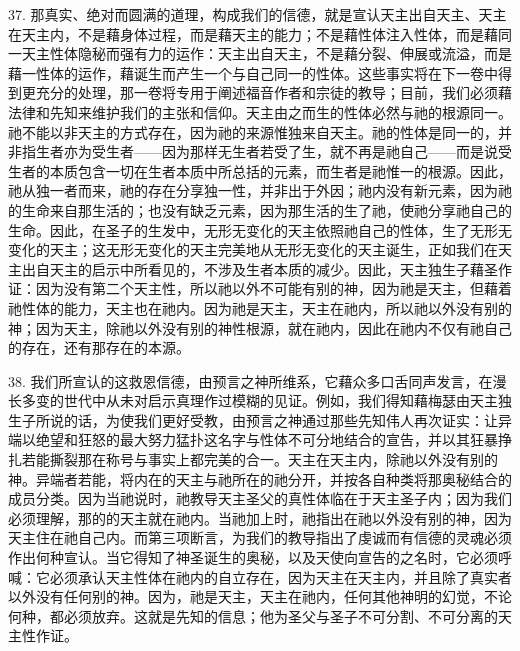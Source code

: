 37. 那真实、绝对而圆满的道理，构成我们的信德，就是宣认天主出自天主、天主在天主内，不是藉身体过程，而是藉天主的能力；不是藉性体注入性体，而是藉同一天主性体隐秘而强有力的运作：天主出自天主，不是藉分裂、伸展或流溢，而是藉一性体的运作，藉诞生而产生一个与自己同一的性体。这些事实将在下一卷中得到更充分的处理，那一卷将专用于阐述福音作者和宗徒的教导；目前，我们必须藉法律和先知来维护我们的主张和信仰。天主由之而生的性体必然与祂的根源同一。祂不能以非天主的方式存在，因为祂的来源惟独来自天主。祂的性体是同一的，并非指生者亦为受生者——因为那样无生者若受了生，就不再是祂自己——而是说受生者的本质包含一切在生者本质中所总括的元素，而生者是祂惟一的根源。因此，祂从独一者而来，祂的存在分享独一性，并非出于外因；祂内没有新元素，因为祂的生命来自那生活的；也没有缺乏元素，因为那生活的生了祂，使祂分享祂自己的生命。因此，在圣子的生发中，无形无变化的天主依照祂自己的性体，生了无形无变化的天主；这无形无变化的天主完美地从无形无变化的天主诞生，正如我们在天主出自天主的启示中所看见的，不涉及生者本质的减少。因此，天主独生子藉圣作证：因为没有第二个天主性，所以祂以外不可能有别的神，因为祂是天主，但藉着祂性体的能力，天主也在祂内。因为祂是天主，天主在祂内，所以祂以外没有别的神；因为天主，除祂以外没有别的神性根源，就在祂内，因此在祂内不仅有祂自己的存在，还有那存在的本源。\par

38. 我们所宣认的这救恩信德，由预言之神所维系，它藉众多口舌同声发言，在漫长多变的世代中从未对启示真理作过模糊的见证。例如，我们得知藉梅瑟由天主独生子所说的话，为使我们更好受教，由预言之神通过那些先知伟人再次证实：让异端以绝望和狂怒的最大努力猛扑这名字与性体不可分地结合的宣告，并以其狂暴挣扎若能撕裂那在称号与事实上都完美的合一。天主在天主内，除祂以外没有别的神。异端者若能，将内在的天主与祂所在的祂分开，并按各自种类将那奥秘结合的成员分类。因为当祂说时，祂教导天主圣父的真性体临在于天主圣子内；因为我们必须理解，那的的天主就在祂内。当祂加上时，祂指出在祂以外没有别的神，因为天主住在祂自己内。而第三项断言，为我们的教导指出了虔诚而有信德的灵魂必须作出何种宣认。当它得知了神圣诞生的奥秘，以及天使向宣告的之名时，它必须呼喊：它必须承认天主性体在祂内的自立存在，因为天主在天主内，并且除了真实者以外没有任何别的神。因为，祂是天主，天主在祂内，任何其他神明的幻觉，不论何种，都必须放弃。这就是先知的信息；他为圣父与圣子不可分割、不可分离的天主性作证。\par

